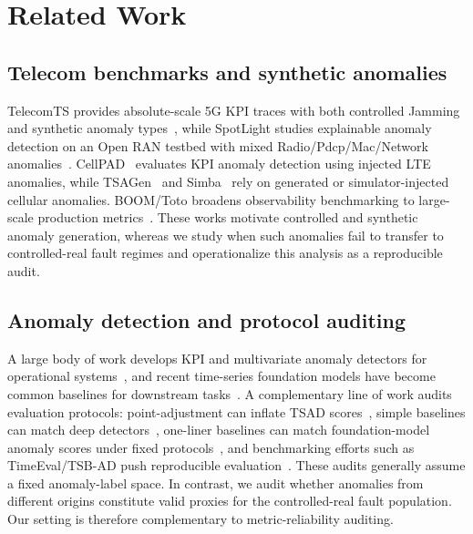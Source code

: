 \documentclass[sigconf,review]{acmart}
\begin{document}
\section{Related Work}
\label{sec:related}

\subsection{Telecom benchmarks and synthetic anomalies}
TelecomTS provides absolute-scale 5G KPI traces with both controlled Jamming and synthetic anomaly types~\citep{feng2025telecomts}, while SpotLight studies explainable anomaly detection on an Open RAN testbed with mixed Radio/Pdcp/Mac/Network anomalies~\citep{sun2024spotlight}. CellPAD~\citep{wu2018cellpad} evaluates KPI anomaly detection using injected LTE anomalies, while TSAGen~\citep{wang2021tsagen} and Simba~\citep{hasan2024simba} rely on generated or simulator-injected cellular anomalies. BOOM/Toto broadens observability benchmarking to large-scale production metrics~\citep{cohen2025toto}. These works motivate controlled and synthetic anomaly generation, whereas we study when such anomalies fail to transfer to controlled-real fault regimes and operationalize this analysis as a reproducible audit.

\subsection{Anomaly detection and protocol auditing}
A large body of work develops KPI and multivariate anomaly detectors for operational systems~\citep{liu2015opprentice,xu2018donut,ren2019microsoft,yu2023autokad,su2019omnianomaly,audibert2020usad}, and recent time-series foundation models have become common baselines for downstream tasks~\citep{goswami2024moment,cohen2025toto,feofanov2025mantis,ansari2024chronos}. A complementary line of work audits evaluation protocols: point-adjustment can inflate TSAD scores~\citep{kim2022pointadjust}, simple baselines can match deep detectors~\citep{audibert2022usadrevisited}, one-liner baselines can match foundation-model anomaly scores under fixed protocols~\citep{zhu2026oneliners}, and benchmarking efforts such as TimeEval/TSB-AD push reproducible evaluation~\citep{wenig2022timeeval,liu2024tsbad}. These audits generally assume a fixed anomaly-label space. In contrast, we audit whether anomalies from different origins constitute valid proxies for the controlled-real fault population. Our setting is therefore complementary to metric-reliability auditing.
\end{document}
